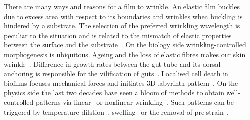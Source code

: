 \documentclass[twocolumn,superscriptaddress,showpacs,preprintnumbers,
amsmath,amssymb,prl]{revtex4-1}
\begin{document}

There are many ways and reasons for a film to wrinkle. An elastic film buckles due to excess area with respect to its boundaries and wrinkles when buckling is hindered by a substrate. The selection of the preferred wrinkling wavelength is peculiar to the situation and is related to the mismatch of elastic properties between the surface and the substrate~\cite{Gough1940, Bijlaard1946, Biot1957, Bowden1998, Cerda2003, Genzer2006}. On the biology side wrinkling-controlled morphogenesis is ubiquitous. Ageing and the loss of elastic fibres makes our skin wrinkle~\cite{Bissett1987, Genzer2006}. Difference in growth rates between the gut tube and its dorsal anchoring is responsible for the vilification of guts~\cite{Savin2011, Ciarletta2014, Shyer2013}. Localised cell death in biofilms focuses mechanical forces and initiates 3D labyrinth pattern~\cite{Trejo2013, Asally2012}. On the physics side the last two decades have seen a bloom of methods to obtain well-controlled patterns via linear~\cite{Bowden1998, Genzer2006, Hu1998, Kim2010, Vandeparre2011, Li2013} or nonlinear wrinkling~\cite{Efimenko2005, Guvendiren2010, Kim2011a, Brau2011}. Such patterns can be triggered by temperature dilation~\cite{Bowden1998}, swelling~\cite{Hu1998,Kim2010} or the removal of pre-strain~\cite{Genzer2006}. 
\end{document}

